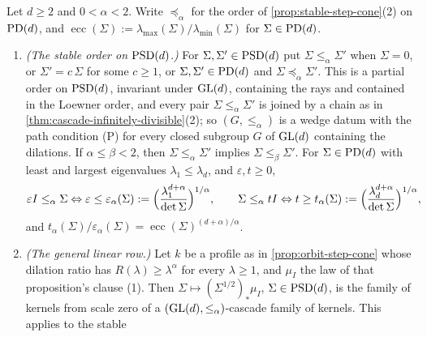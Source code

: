 \begin{proposition}
\label{prop:similarity-stable-order-families}
\leanok
Let $d \ge 2$ and $0 < \alpha < 2$. Write $\preceq_\alpha$ for the order of
\ref{prop:stable-step-cone}(2) on $\mathrm{PD}(d)$, and $\operatorname{ecc}(\Sigma) :=
\lambda_{\max}(\Sigma)/\lambda_{\min}(\Sigma)$ for $\Sigma \in \mathrm{PD}(d)$.
\begin{enumerate}
\item \emph{(The stable order on $\mathrm{PSD}(d)$.)} For $\Sigma, \Sigma' \in \mathrm{PSD}(d)$ put
$\Sigma \le_\alpha \Sigma'$ when $\Sigma = 0$, or $\Sigma' = c\,\Sigma$ for some $c \ge 1$, or
$\Sigma, \Sigma' \in \mathrm{PD}(d)$ and $\Sigma \preceq_\alpha \Sigma'$. This is a partial order on $\mathrm{PSD}(d)$,
invariant under $\mathrm{GL}(d)$, containing the rays and contained in the Loewner order, and every pair
$\Sigma \le_\alpha \Sigma'$ is joined by a chain as in \ref{thm:cascade-infinitely-divisible}(2); so
$(G, \le_\alpha)$ is a wedge datum with the path condition (P) for every closed subgroup $G$ of $\mathrm{GL}(d)$
containing the dilations. If $\alpha \le \beta < 2$, then $\Sigma \le_\alpha \Sigma'$ implies
$\Sigma \le_\beta \Sigma'$. For $\Sigma \in \mathrm{PD}(d)$ with least and largest eigenvalues
$\lambda_1 \le \lambda_d$, and $\varepsilon, t \ge 0$,
\[
  \varepsilon I \le_\alpha \Sigma \Leftrightarrow \varepsilon \le \varepsilon_\alpha(\Sigma) :=
  \Bigl(\frac{\lambda_1^{d+\alpha}}{\det\Sigma}\Bigr)^{1/\alpha} ,
  \qquad
  \Sigma \le_\alpha tI \Leftrightarrow t \ge t_\alpha(\Sigma) :=
  \Bigl(\frac{\lambda_d^{d+\alpha}}{\det\Sigma}\Bigr)^{1/\alpha} ,
\]
and $t_\alpha(\Sigma)/\varepsilon_\alpha(\Sigma) = \operatorname{ecc}(\Sigma)^{(d+\alpha)/\alpha}$.
\item \emph{(The general linear row.)} Let $k$ be a profile as in \ref{prop:orbit-step-cone} whose
dilation ratio has $R(\lambda) \ge \lambda^\alpha$ for every $\lambda \ge 1$, and $\mu_I$ the law of that
proposition's clause (1). Then $\Sigma \mapsto (\Sigma^{1/2})_*\mu_I$, $\Sigma \in \mathrm{PSD}(d)$, is the family of
kernels from scale zero of a $(\mathrm{GL}(d), \le_\alpha)$-cascade family of kernels. This applies to the stable

\end{enumerate}
\end{proposition}
